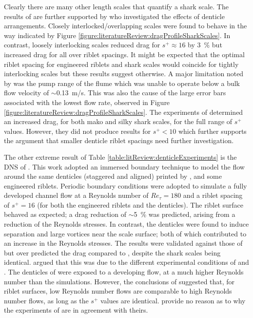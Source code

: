 \documentclass[12pt,oneside,a4paper]{article}
\begin{document}
%
Clearly there are many other length scales that quantify a shark scale. The results of \cite{wen2014} are further supported by \cite{wen2015} who investigated the effects of denticle arrangements. Closely interlocked/overlapping scales were found to behave in the way indicated by Figure \ref{figure:literatureReview:dragProfileSharkScales}. In contrast, loosely interlocking scales reduced drag for $s^+ \approx 16$ by \SI{3}{\%} but increased drag for all over riblet spacings. It might be expected that the optimal riblet spacing for engineered riblets and shark scales would coincide for tightly interlocking scales but these results suggest otherwise. A major limitation noted by \cite{wen2014} was the pump range of the flume which was unable to operate below a bulk flow velocity of $\sim$\SI{0.13}{m/s}. This was also the cause of the large error bars associated with the lowest flow rate, observed in Figure \ref{figure:literatureReview:dragProfileSharkScales}. The experiments of \cite{bechert1985} determined an increased drag, for both mako and silky shark scales, for the full range of $s^+$ values. However, they did not produce results for $s^+<10$ which further supports the argument that smaller denticle riblet spacings need further investigation.

The other extreme result of Table \ref{table:litReview:denticleExperiments} is the DNS of \cite{boomsma2015}. This work adopted an immersed boundary technique to model the flow around the same denticles (staggered and aligned) printed by \cite{wen2014,wen2015}, and some engineered riblets. Periodic boundary conditions were adopted to simulate a fully developed channel flow at a Reynolds number of $Re_\tau = 180$ and a riblet spacing of $s^+=16$ (for both the engineered riblets and the denticles). The riblet surface behaved as expected; a drag reduction of $\sim$\SI{5}{\%} was predicted, arising from a reduction of the Reynolds stresses. In contrast, the denticles were found to induce separation and large vortices near the scale surface; both of which contributed to an increase in the Reynolds stresses. The results were validated against those of \cite{bechert1985} but over predicted the drag compared to \cite{wen2014,wen2015}, despite the shark scales being identical. \cite{boomsma2016} argued that this was due to the different experimental conditions of \cite{wen2014} and \cite{bechert1985}. The denticles of \cite{wen2014} were exposed to a developing flow, at a much higher Reynolds number than the simulations. However, the conclusions of \cite{garcia2012} suggested that, for riblet surfaces, low Reynolds number flows are comparable to high Reynolds number flows, as long as the $s^+$ values are identical. \cite{boomsma2016} provide no reason as to why the experiments of \cite{bechert1985} are in agreement with theirs. 
\end{document}

